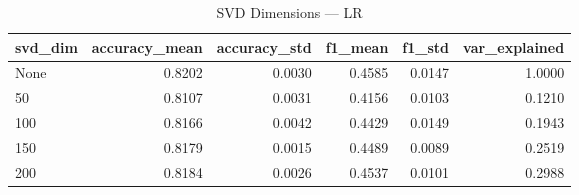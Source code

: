 \begin{table}
\caption{SVD Dimensions — LR}
\begin{tabular}{lrrrrr}
\toprule
svd_dim & accuracy_mean & accuracy_std & f1_mean & f1_std & var_explained \\
\midrule
None & 0.8202 & 0.0030 & 0.4585 & 0.0147 & 1.0000 \\
50 & 0.8107 & 0.0031 & 0.4156 & 0.0103 & 0.1210 \\
100 & 0.8166 & 0.0042 & 0.4429 & 0.0149 & 0.1943 \\
150 & 0.8179 & 0.0015 & 0.4489 & 0.0089 & 0.2519 \\
200 & 0.8184 & 0.0026 & 0.4537 & 0.0101 & 0.2988 \\
\bottomrule
\end{tabular}
\end{table}
